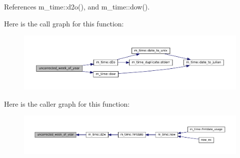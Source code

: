 References m\+\_\+time\+::d2o(), and m\+\_\+time\+::dow().

Here is the call graph for this function\+:\nopagebreak
\begin{figure}[H]
\begin{center}
\leavevmode
\includegraphics[width=350pt]{M__time_8f90_a4a68c5e906616f64da0c3d165fc41479_cgraph}
\end{center}
\end{figure}
Here is the caller graph for this function\+:\nopagebreak
\begin{figure}[H]
\begin{center}
\leavevmode
\includegraphics[width=350pt]{M__time_8f90_a4a68c5e906616f64da0c3d165fc41479_icgraph}
\end{center}
\end{figure}
